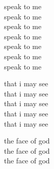 \null
\vfill
\begin{center}
\begin{Spacing}{0}
speak to me\\\vspace{-7pt}
speak to me\\\vspace{-7pt}
speak to me\\\vspace{-7pt}
speak to me\\\vspace{-7pt}
speak to me\\\vspace{-7pt}
speak to me\\\vspace{-7pt}
speak to me

that i may see\\\vspace{-7pt}
that i may see\\\vspace{-7pt}
that i may see\\\vspace{-7pt}
that i may see\\\vspace{-7pt}
that i may see

the face of god\\\vspace{-7pt}
the face of god\\\vspace{-7pt}
the face of god
\end{Spacing}
\end{center}
\vfill
\newpage

